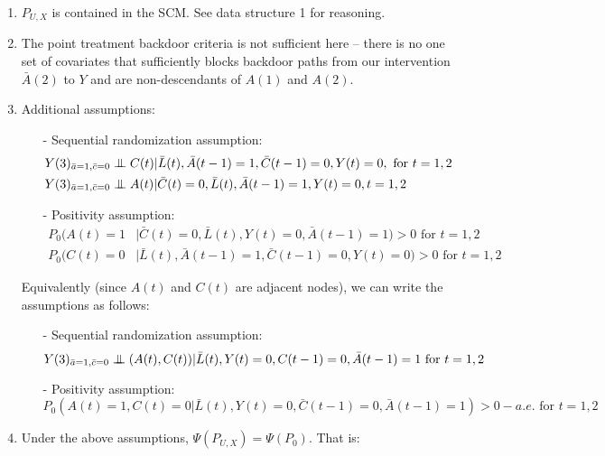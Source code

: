 \documentclass{exam}
\newcommand\independent{\protect\mathpalette{\protect\independenT}{\perp}}
\def\independenT#1#2{\mathrel{\setbox0\hbox{$#1#2$}%
    \copy0\kern-\wd0\mkern4mu\box0}}
\begin{document}
\begin{solution}
\begin{enumerate}
\item $P_{U,X}$ is contained in the SCM. See data structure 1 for reasoning.
\item The point treatment backdoor criteria is not sufficient here -- there is no one set of covariates that sufficiently blocks backdoor paths from our intervention $\bar{A}(2)$ to $Y$ and are non-descendants of $A(1)$ and $A(2)$.
\item Additional assumptions:
\begin{itemize}
\item[-] Sequential randomization assumption:
\begin{align*}
Y(3)_{\bar{a}=1, \bar{c}=0} &\independent C(t) | \bar{L}(t), \bar{A}(t-1) = 1, \bar{C}(t-1) = 0, Y(t) = 0, \text{ for } t = 1, 2 \\
Y(3)_{\bar{a}=1, \bar{c}=0} &\independent A(t) | \bar{C}(t) = 0, \bar{L}(t), \bar{A}(t-1) = 1, Y(t) = 0, t = 1, 2 
\end{align*}
\item[-] Positivity assumption:
\begin{align*}
P_0(A(t)=1 &| \bar{C}(t)=0, \bar{L}(t), Y(t) = 0, \bar{A}(t-1)=1)>0 \text{ for } t=1,2 \\
P_0(C(t) = 0 &| \bar{L}(t), \bar{A}(t-1)=1, \bar{C}(t-1) =0, Y(t)=0) > 0 \text{ for } t = 1, 2 
\end{align*}
\end{itemize}

Equivalently (since $A(t)$ and $C(t)$ are adjacent nodes), we can write the assumptions as follows:
\begin{itemize}
\item[-] Sequential randomization assumption:
\[
Y(3)_{\bar{a}=1,\bar{c}=0} \independent (A(t),C(t)) | \bar{L}(t),Y(t)=0,C(t-1)=0,\bar{A}(t-1) = 1 \text{ for } t=1,2
\]
\item[-] Positivity assumption:
\[
P_0(A(t) = 1, C(t) = 0 | \bar{L}(t), Y(t)=0, \bar{C}(t-1) = 0, \bar{A}(t-1) = 1) > 0 - a.e. \text{ for } t = 1,2
\]
\end{itemize}



\item Under the above assumptions, $\Psi(P_{U,X}) = \Psi(P_0)$. That is:


\end{enumerate}
\end{solution}
\end{document}
